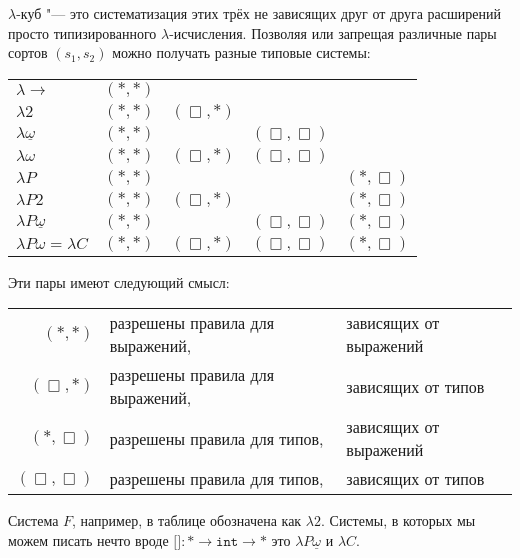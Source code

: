 $\lambda$-куб "--- это систематизация этих трёх не зависящих друг от друга расширений
просто типизированного $\lambda$-исчисления.
Позволяя или запрещая различные пары сортов $(s_1, s_2)$ можно получать разные типовые системы:
\begin{center}
\begin{tabular}{l c c c c} \toprule
    $\lambda{\to}$         & $(*, *)$ &             &                &             \\
    $\lambda 2$                    & $(*, *)$ & $(\Box, *)$ &                &             \\
    $\lambda \underline \omega$    & $(*, *)$ &             & $(\Box, \Box)$ &             \\
    $\lambda \omega$               & $(*, *)$ & $(\Box, *)$ & $(\Box, \Box)$ &             \\
    $\lambda P$                    & $(*, *)$ &             &                & $(*, \Box)$ \\
    $\lambda P2$                   & $(*, *)$ & $(\Box, *)$ &                & $(*, \Box)$ \\
    $\lambda P\underline \omega$   & $(*, *)$ &             & $(\Box, \Box)$ & $(*, \Box)$ \\
    $\lambda P \omega = \lambda C$ & $(*, *)$ & $(\Box, *)$ & $(\Box, \Box)$ & $(*, \Box)$ \\ \bottomrule
\end{tabular}
\end{center}%
Эти пары имеют следующий смысл:
\begin{center}
\begin{tabular}{r l@{\ }l} \toprule
    $(*, *)$       & разрешены правила для выражений, &зависящих от выражений \\
    $(\Box, *)$    & разрешены правила для выражений, &зависящих от типов     \\
    $(*, \Box)$    & разрешены правила для типов,     &зависящих от выражений \\
    $(\Box, \Box)$ & разрешены правила для типов,     &зависящих от типов     \\ \bottomrule
\end{tabular}
\end{center}

Система $F$, например, в таблице обозначена как $\lambda 2$.
Системы, в которых мы можем писать нечто вроде
$\texttt{[]}: * \to \mathtt{int} \to *$ это $\lambda P \underline \omega$ и $\lambda C$.

